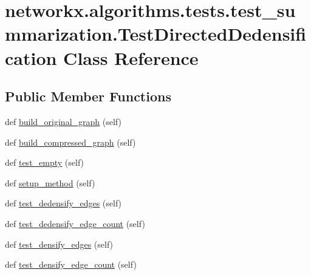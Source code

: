 \hypertarget{classnetworkx_1_1algorithms_1_1tests_1_1test__summarization_1_1TestDirectedDedensification}{}\section{networkx.\+algorithms.\+tests.\+test\+\_\+summarization.\+Test\+Directed\+Dedensification Class Reference}
\label{classnetworkx_1_1algorithms_1_1tests_1_1test__summarization_1_1TestDirectedDedensification}
\subsection*{Public Member Functions}
\begin{DoxyCompactItemize}
\item 
def \hyperlink{classnetworkx_1_1algorithms_1_1tests_1_1test__summarization_1_1TestDirectedDedensification_ad8f8a9c6b13938782ec8b1154925eb9a}{build\+\_\+original\+\_\+graph} (self)
\item 
def \hyperlink{classnetworkx_1_1algorithms_1_1tests_1_1test__summarization_1_1TestDirectedDedensification_aac867f2f2cdee5f585e941e87a737f1d}{build\+\_\+compressed\+\_\+graph} (self)
\item 
def \hyperlink{classnetworkx_1_1algorithms_1_1tests_1_1test__summarization_1_1TestDirectedDedensification_a300bbaa14ece763bec4f4f24125a8d10}{test\+\_\+empty} (self)
\item 
def \hyperlink{classnetworkx_1_1algorithms_1_1tests_1_1test__summarization_1_1TestDirectedDedensification_a70b6fdfce2fcf9e36867ed753f5b2a62}{setup\+\_\+method} (self)
\item 
def \hyperlink{classnetworkx_1_1algorithms_1_1tests_1_1test__summarization_1_1TestDirectedDedensification_a1776aaf85171395d48dc29e160e30592}{test\+\_\+dedensify\+\_\+edges} (self)
\item 
def \hyperlink{classnetworkx_1_1algorithms_1_1tests_1_1test__summarization_1_1TestDirectedDedensification_abc536cac38dabd7379c22faf20c5e3e8}{test\+\_\+dedensify\+\_\+edge\+\_\+count} (self)
\item 
def \hyperlink{classnetworkx_1_1algorithms_1_1tests_1_1test__summarization_1_1TestDirectedDedensification_aa47eac270df49e8630a9d0fa6c88d5ad}{test\+\_\+densify\+\_\+edges} (self)
\item 
def \hyperlink{classnetworkx_1_1algorithms_1_1tests_1_1test__summarization_1_1TestDirectedDedensification_afb867ba23d6df371ad0ac9c109994e3f}{test\+\_\+densify\+\_\+edge\+\_\+count} (self)
\end{DoxyCompactItemize}
